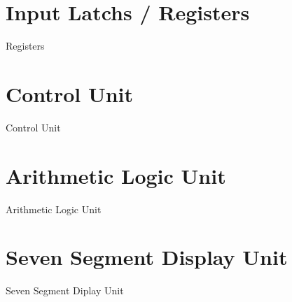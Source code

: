
\section{{Input Latchs / Registers}}

	{Registers}

\section{{Control Unit}}

	{Control Unit}

\section{{Arithmetic Logic Unit}}

	{Arithmetic Logic Unit}

\section{{Seven Segment Display Unit}}

	{Seven Segment Diplay Unit}
